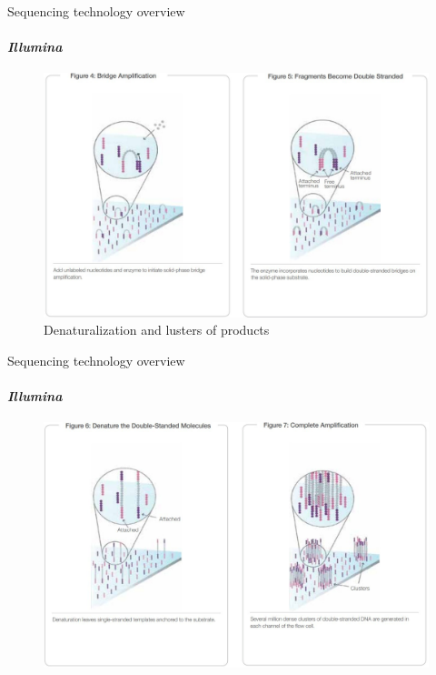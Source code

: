\documentclass{if-beamer}
\begin{document}
\begin{frame}{Sequencing technology overview}
\framesubtitle{\emph{Illumina}}
\begin{figure}
\centering
\includegraphics[scale=0.2]{illumina2.jpg}
\caption{Denaturalization and lusters of products} 
\end{figure}
\end{frame}
\begin{frame}{Sequencing technology overview}
\framesubtitle{\emph{Illumina}}
\begin{figure}
\centering
\includegraphics[scale=0.2]{illumina3.jpg}
\end{figure}
\end{frame}
\end{document}
